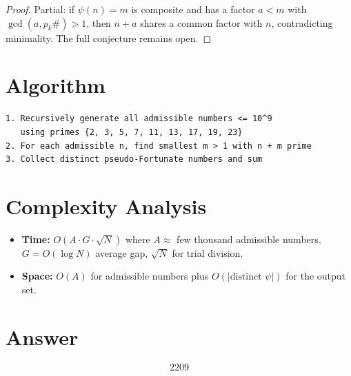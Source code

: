 \documentclass[12pt]{article}
\begin{document}
\begin{proof}
Partial: if $\psi(n) = m$ is composite and has a factor $a < m$ with $\gcd(a, p_k\#) > 1$, then $n + a$ shares a common factor with $n$, contradicting minimality. The full conjecture remains open.
\end{proof}

\section{Algorithm}

\begin{verbatim}
1. Recursively generate all admissible numbers <= 10^9
   using primes {2, 3, 5, 7, 11, 13, 17, 19, 23}
2. For each admissible n, find smallest m > 1 with n + m prime
3. Collect distinct pseudo-Fortunate numbers and sum
\end{verbatim}

\section{Complexity Analysis}
\begin{itemize}
\item \textbf{Time:} $O(A \cdot G \cdot \sqrt{N})$ where $A \approx$ few thousand admissible numbers, $G = O(\log N)$ average gap, $\sqrt{N}$ for trial division.
\item \textbf{Space:} $O(A)$ for admissible numbers plus $O(|\text{distinct } \psi|)$ for the output set.
\end{itemize}

\section{Answer}

\[
\boxed{2209}
\]
\end{document}
